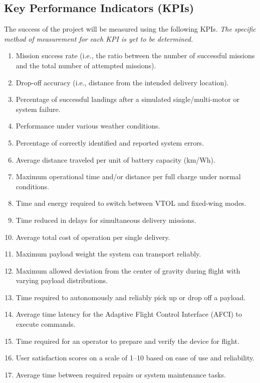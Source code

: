 \documentclass[12pt]{article}
\begin{document}
\subsection{Key Performance Indicators (KPIs)}
The success of the project will be measured using the following KPIs.
\textit{The specific method of measurement for each KPI is yet to be determined.}
\begin{enumerate}
    \item Mission success rate (i.e., the ratio between the number of successful missions and the total number of attempted missions).
    \item Drop-off accuracy (i.e., distance from the intended delivery location).
    \item Percentage of successful landings after a simulated single/multi-motor or system failure.
    \item Performance under various weather conditions.
    \item Percentage of correctly identified and reported system errors.

    \item Average distance traveled per unit of battery capacity (km/Wh).
    \item Maximum operational time and/or distance per full charge under normal conditions.
    \item Time and energy required to switch between VTOL and fixed-wing modes.
    \item Time reduced in delays for simultaneous delivery missions.
    \item Average total cost of operation per single delivery.

    \item Maximum payload weight the system can transport reliably.
    \item Maximum allowed deviation from the center of gravity during flight with varying payload distributions.
    \item Time required to autonomously and reliably pick up or drop off a payload.

    \item Average time latency for the Adaptive Flight Control Interface (AFCI) to execute commands.
    \item Time required for an operator to prepare and verify the device for flight.
    \item User satisfaction scores on a scale of 1–10 based on ease of use and reliability.

    \item Average time between required repairs or system maintenance tasks.
\end{enumerate}
\end{document}
